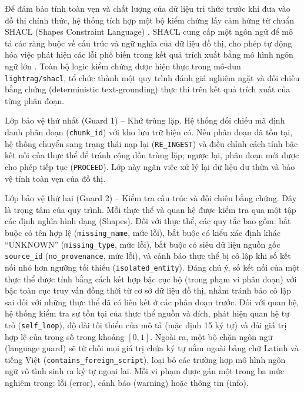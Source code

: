 \indent Để đảm bảo tính toàn vẹn và chất lượng của dữ liệu tri thức trước khi đưa vào đồ thị chính thức, hệ thống tích hợp một bộ kiểm chứng lấy cảm hứng từ chuẩn SHACL (Shapes Constraint Language) \cite{shacl_w3c}. SHACL cung cấp một ngôn ngữ để mô tả các ràng buộc về cấu trúc và ngữ nghĩa của dữ liệu đồ thị, cho phép tự động hóa việc phát hiện các lỗi phổ biến trong kết quả trích xuất bằng mô hình ngôn ngữ lớn \cite{shacl_wikidata}. Toàn bộ logic kiểm chứng được hiện thực trong mô-đun \texttt{lightrag/shacl}, tổ chức thành một quy trình đánh giá nghiêm ngặt và đối chiếu bằng chứng (deterministic text-grounding) thực thi trên kết quả trích xuất của từng phân đoạn.

\indent Lớp bảo vệ thứ nhất (Guard 1) -- Khử trùng lặp. Hệ thống đối chiếu mã định danh phân đoạn (\texttt{chunk\_id}) với kho lưu trữ hiện có. Nếu phân đoạn đã tồn tại, hệ thống chuyển sang trạng thái nạp lại (\texttt{RE\_INGEST}) và điều chỉnh cách tính bậc kết nối của thực thể để tránh cộng dồn trùng lặp; ngược lại, phân đoạn mới được cho phép tiếp tục (\texttt{PROCEED}). Lớp này ngăn việc xử lý lại dữ liệu dư thừa và bảo vệ tính toàn vẹn của đồ thị.

\indent Lớp bảo vệ thứ hai (Guard 2) -- Kiểm tra cấu trúc và đối chiếu bằng chứng. Đây là trọng tâm của quy trình. Mỗi thực thể và quan hệ được kiểm tra qua một tập các định nghĩa hình dạng (Shapes). Đối với thực thể, các quy tắc bao gồm: bắt buộc có tên hợp lệ (\texttt{missing\_name}, mức lỗi), bắt buộc có kiểu xác định khác ``UNKNOWN'' (\texttt{missing\_type}, mức lỗi), bắt buộc có siêu dữ liệu nguồn gốc \texttt{source\_id} (\texttt{no\_provenance}, mức lỗi), và cảnh báo thực thể bị cô lập khi số kết nối nhỏ hơn ngưỡng tối thiểu (\texttt{isolated\_entity}). Đáng chú ý, số kết nối của một thực thể được tính bằng cách kết hợp bậc cục bộ (trong phạm vi phân đoạn) với bậc toàn cục truy vấn đồng thời từ cơ sở dữ liệu đồ thị, nhằm tránh báo cô lập sai đối với những thực thể đã có liên kết ở các phân đoạn trước. Đối với quan hệ, hệ thống kiểm tra sự tồn tại của thực thể nguồn và đích, phát hiện quan hệ tự trỏ (\texttt{self\_loop}), độ dài tối thiểu của mô tả (mặc định 15 ký tự) và dải giá trị hợp lệ của trọng số trong khoảng $[0, 1]$. Ngoài ra, một bộ chặn ngôn ngữ (language guard) sẽ từ chối mọi giá trị chứa ký tự nằm ngoài bảng chữ Latinh và tiếng Việt (\texttt{contains\_foreign\_script}), loại bỏ các trường hợp mô hình ngôn ngữ vô tình sinh ra ký tự ngoại lai. Mỗi vi phạm được gán một trong ba mức nghiêm trọng: lỗi (error), cảnh báo (warning) hoặc thông tin (info).

